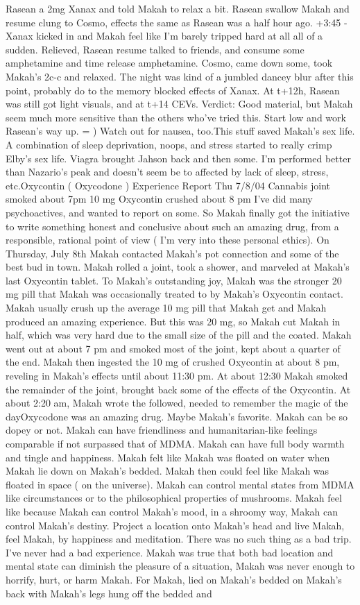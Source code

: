 \documentclass[12pt]{book}
\begin{document}
Rasean a 2mg Xanax and told Makah to relax a bit. Rasean swallow Makah and resume clung to Cosmo, effects the same as Rasean was a half hour ago. +3:45 - Xanax kicked in and Makah feel like I'm barely tripped hard at all all of a sudden. Relieved, Rasean resume talked to friends, and consume some amphetamine and time release amphetamine. Cosmo, came down some, took Makah's 2c-c and relaxed. The night was kind of a jumbled dancey blur after this point, probably do to the memory blocked effects of Xanax. At t+12h, Rasean was still got light visuals, and at t+14 CEVs. Verdict: Good material, but Makah seem much more sensitive than the others who've tried this. Start low and work Rasean's way up. = ) Watch out for nausea, too.This stuff saved Makah's sex life. A combination of sleep deprivation, noops, and stress started to really crimp Elby's sex life. Viagra brought Jahson back and then some. I'm performed better than Nazario's peak and doesn't seem be to affected by lack of sleep, stress, etc.Oxycontin ( Oxycodone ) Experience Report Thu 7/8/04 Cannabis joint smoked about 7pm 10 mg Oxycontin crushed about 8 pm I've did many psychoactives, and wanted to report on some. So Makah finally got the initiative to write something honest and conclusive about such an amazing drug, from a responsible, rational point of view ( I'm very into these personal ethics). On Thursday, July 8th Makah contacted Makah's pot connection and some of the best bud in town. Makah rolled a joint, took a shower, and marveled at Makah's last Oxycontin tablet. To Makah's outstanding joy, Makah was the stronger 20 mg pill that Makah was occasionally treated to by Makah's Oxycontin contact. Makah usually crush up the average 10 mg pill that Makah get and Makah produced an amazing experience. But this was 20 mg, so Makah cut Makah in half, which was very hard due to the small size of the pill and the coated. Makah went out at about 7 pm and smoked most of the joint, kept about a quarter of the end. Makah then ingested the 10 mg of crushed Oxycontin at about 8 pm, reveling in Makah's effects until about 11:30 pm. At about 12:30 Makah smoked the remainder of the joint, brought back some of the effects of the Oxycontin. At about 2:20 am, Makah wrote the followed, needed to remember the magic of the dayOxycodone was an amazing drug. Maybe Makah's favorite. Makah can be so dopey or not. Makah can have friendliness and humanitarian-like feelings comparable if not surpassed that of MDMA. Makah can have full body warmth and tingle and happiness. Makah felt like Makah was floated on water when Makah lie down on Makah's bedded. Makah then could feel like Makah was floated in space ( on the universe). Makah can control mental states from MDMA like circumstances or to the philosophical properties of mushrooms. Makah feel like because Makah can control Makah's mood, in a shroomy way, Makah can control Makah's destiny. Project a location onto Makah's head and live Makah, feel Makah, by happiness and meditation. There was no such thing as a bad trip. I've never had a bad experience. Makah was true that both bad location and mental state can diminish the pleasure of a situation, Makah was never enough to horrify, hurt, or harm Makah. For Makah, lied on Makah's bedded on Makah's back with Makah's legs hung off the bedded and 
\end{document}
